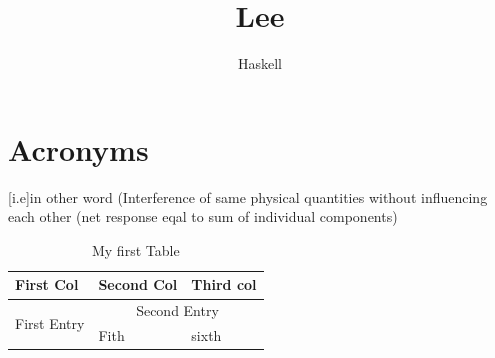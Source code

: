 \documentclass[a4paper,12pt]{article}
\author{Haskell}
\title{Lee}
\begin{document}
\maketitle

\tableofcontents

\newpage

\section{Acronyms}
  \begin{acronym}
    [i.e]{in other word}
    (Interference of same physical quantities without influencing each other (net response eqal to sum of individual components)
  \end{acronym}

  \begin{table}
  \begin{center}
    \begin{tabular}{|p{}|p{}|p{}|}
        \hline
      \textbf{First Col} & \textbf{Second Col} & \textbf{Third col} \\
      \hline
      \hline
      \multirow{2}{*}{First Entry} & \multicolumn{2}{c|}{Second Entry} \\
      & Fith & sixth \\
      \hline
    \end{tabular}
    \caption{My first Table}
    \label{tab:table}
  \end{center}
  \end{table}
\end{document}
